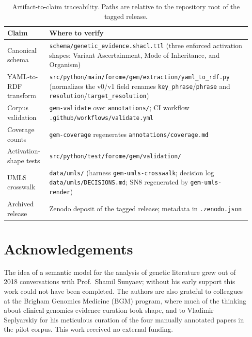 \begin{table}[tbp]
\centering
\caption{Artifact-to-claim traceability. Paths are relative to the
repository root of the tagged release.}
\label{tab:conformance}
\small
\begin{tabularx}{\linewidth}{@{}lX@{}}
\toprule
Claim & Where to verify \\
\midrule
Canonical schema & \texttt{schema/genetic\_evidence.shacl.ttl} (three enforced activation shapes: Variant Ascertainment, Mode of Inheritance, and Organism) \\
YAML-to-RDF transform & \texttt{src/python/main/forome/gem/extraction/yaml\_to\_rdf.py} (normalizes the v0/v1 field renames \texttt{key\_phrase}/\texttt{phrase} and \texttt{resolution}/\texttt{target\_resolution}) \\
Corpus validation & \texttt{gem-validate} over \texttt{annotations/}; CI workflow \texttt{.github/workflows/validate.yml} \\
Coverage counts & \texttt{gem-coverage} regenerates \texttt{annotations/coverage.md} \\
Activation-shape tests & \texttt{src/python/test/forome/gem/validation/} \\
UMLS crosswalk & \texttt{data/umls/} (harness \texttt{gem-umls-crosswalk}; decision log \texttt{data/umls/DECISIONS.md}; SN8 regenerated by \texttt{gem-umls-render}) \\
Archived release & Zenodo deposit of the tagged release; metadata in \texttt{.zenodo.json} \\
\bottomrule
\end{tabularx}
\end{table}

\section*{Acknowledgements}

The idea of a semantic model for the analysis of genetic literature
grew out of 2018 conversations with Prof.\ Shamil Sunyaev; without
his early support this work could not have been completed. The
authors are also grateful to colleagues at the Brigham Genomics
Medicine (BGM) program, where much of the thinking about
clinical-genomics evidence curation took shape, and to
Vladimir Seplyarskiy for his meticulous curation of the four
manually annotated papers in the pilot corpus. This work received
no external funding.
